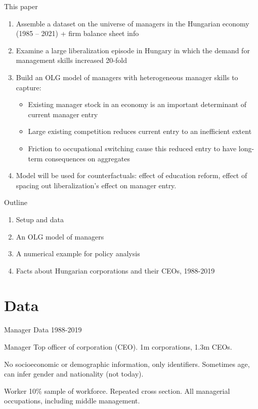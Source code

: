 \documentclass[
  ignorenonframetext,
  aspectratio=1610,
]{beamer}
\providecommand{\tightlist}{%
  \setlength{\itemsep}{0pt}\setlength{\parskip}{0pt}}
\begin{document}
\begin{frame}{This paper}
\protect\hypertarget{this-paper}{}
\begin{enumerate}
\tightlist
\item
  Assemble a dataset on the universe of managers in the Hungarian
  economy (1985 -- 2021) + firm balance sheet info
\item
  Examine a large liberalization episode in Hungary in which the demand
  for management skills increased 20-fold
\item
  Build an OLG model of managers with heterogeneous manager skills to
  capture:

  \begin{itemize}
  \tightlist
  \item
    Existing manager stock in an economy is an important determinant of
    current manager entry
  \item
    Large existing competition reduces current entry to an inefficient
    extent
  \item
    Friction to occupational switching cause this reduced entry to have
    long-term consequences on aggregates
  \end{itemize}
\item
  Model will be used for counterfactuals: effect of education reform,
  effect of spacing out liberalization's effect on manager entry.
\end{enumerate}
\end{frame}

\begin{frame}{Outline}
\protect\hypertarget{outline}{}
\begin{enumerate}
\tightlist
\item
  Setup and data
\item
  An OLG model of managers
\item
  A numerical example for policy analysis
\item
  Facts about Hungarian corporations and their CEOs, 1988-2019
\end{enumerate}
\end{frame}

\hypertarget{data}{%
\section{Data}\label{data}}

\begin{frame}{Manager Data 1988-2019}
\protect\hypertarget{manager-data-1988-2019}{}
\begin{block}{Manager}
\protect\hypertarget{manager}{}
Top officer of corporation (CEO). 1m corporations, 1.3m CEOs.

No socioeconomic or demographic information, only identifiers. Sometimes
age, can infer gender and nationality (not today).
\end{block}

\begin{block}{Worker}
\protect\hypertarget{worker}{}
10\% sample of workforce. Repeated cross section. All managerial
occupations, including middle management.
\end{block}
\end{frame}
\end{document}

